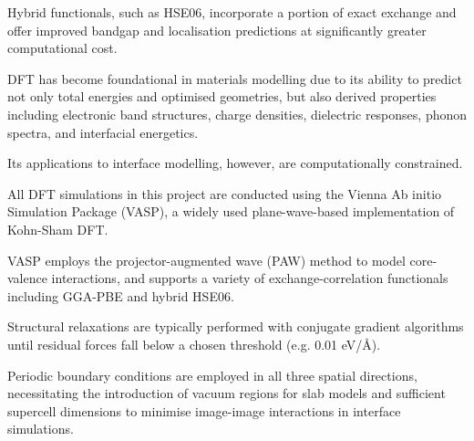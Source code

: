 



Hybrid functionals, such as HSE06, incorporate a portion of exact exchange and offer improved bandgap and localisation
predictions at significantly greater computational cost\cite{Rosen2022-pw}.






DFT has become foundational in materials modelling due to its ability to predict not only total energies and optimised
geometries, but also derived properties including electronic band structures, charge densities, dielectric responses,
phonon spectra, and interfacial energetics.

Its applications to interface modelling, however, are computationally constrained\cite{Gerber2023-yd, Leung2020-tv}.


All DFT simulations in this project are conducted using the Vienna Ab initio Simulation Package (VASP), a widely used
plane-wave-based implementation of Kohn-Sham DFT.

VASP employs the projector-augmented wave (PAW) method to model core-valence interactions, and supports a variety of
exchange-correlation functionals including GGA-PBE and hybrid HSE06\cite{Leung2020-tv}.

Structural relaxations are typically performed with conjugate gradient algorithms until residual forces fall below a
chosen threshold (e.g. 0.01 eV/\AA)\cite{}.




Periodic boundary conditions are employed in all three spatial directions, necessitating the introduction of vacuum
regions for slab models and sufficient supercell dimensions to minimise image-image interactions in interface
simulations\cite{}.


